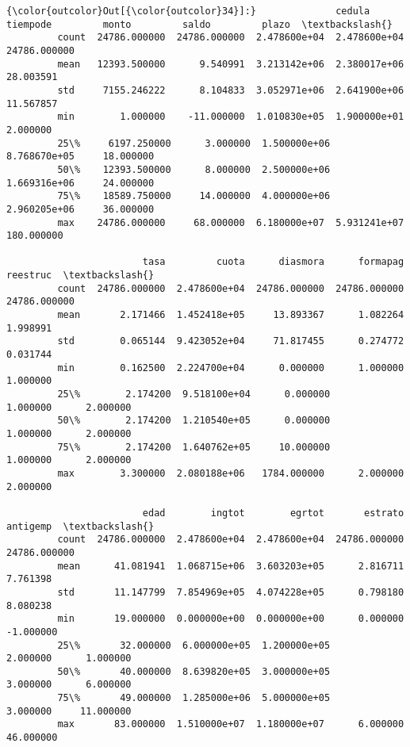 \documentclass[11pt]{article}
\begin{document}
\begin{Verbatim}[commandchars=\\\{\}]
{\color{outcolor}Out[{\color{outcolor}34}]:}              cedula      tiempode         monto         saldo         plazo  \textbackslash{}
         count  24786.000000  24786.000000  2.478600e+04  2.478600e+04  24786.000000   
         mean   12393.500000      9.540991  3.213142e+06  2.380017e+06     28.003591   
         std     7155.246222      8.104833  3.052971e+06  2.641900e+06     11.567857   
         min        1.000000    -11.000000  1.010830e+05  1.900000e+01      2.000000   
         25\%     6197.250000      3.000000  1.500000e+06  8.768670e+05     18.000000   
         50\%    12393.500000      8.000000  2.500000e+06  1.669316e+06     24.000000   
         75\%    18589.750000     14.000000  4.000000e+06  2.960205e+06     36.000000   
         max    24786.000000     68.000000  6.180000e+07  5.931241e+07    180.000000   
         
                        tasa         cuota      diasmora      formapag      reestruc  \textbackslash{}
         count  24786.000000  2.478600e+04  24786.000000  24786.000000  24786.000000   
         mean       2.171466  1.452418e+05     13.893367      1.082264      1.998991   
         std        0.065144  9.423052e+04     71.817455      0.274772      0.031744   
         min        0.162500  2.224700e+04      0.000000      1.000000      1.000000   
         25\%        2.174200  9.518100e+04      0.000000      1.000000      2.000000   
         50\%        2.174200  1.210540e+05      0.000000      1.000000      2.000000   
         75\%        2.174200  1.640762e+05     10.000000      1.000000      2.000000   
         max        3.300000  2.080188e+06   1784.000000      2.000000      2.000000   
         
                        edad        ingtot        egrtot       estrato      antigemp  \textbackslash{}
         count  24786.000000  2.478600e+04  2.478600e+04  24786.000000  24786.000000   
         mean      41.081941  1.068715e+06  3.603203e+05      2.816711      7.761398   
         std       11.147799  7.854969e+05  4.074228e+05      0.798180      8.080238   
         min       19.000000  0.000000e+00  0.000000e+00      0.000000     -1.000000   
         25\%       32.000000  6.000000e+05  1.200000e+05      2.000000      1.000000   
         50\%       40.000000  8.639820e+05  3.000000e+05      3.000000      6.000000   
         75\%       49.000000  1.285000e+06  5.000000e+05      3.000000     11.000000   
         max       83.000000  1.510000e+07  1.180000e+07      6.000000     46.000000   
         

\end{Verbatim}
\end{document}
